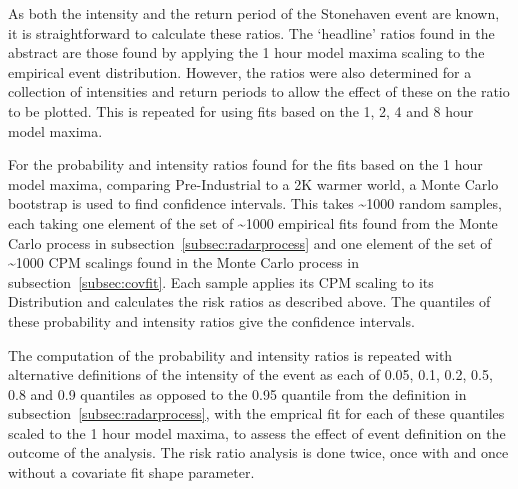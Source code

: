 As both the intensity and the return period of the Stonehaven event are known,
    it is straightforward to calculate these ratios.
The `headline' ratios found in the abstract are those found by applying the 1 hour model maxima scaling to the empirical event distribution.
However, the ratios were also determined for a collection of intensities and return periods to allow the effect of these on the ratio to be plotted.
This is repeated for using fits based on the 1, 2, 4 and 8 hour model maxima.

For the probability and intensity ratios found for the fits based on the 1 hour model maxima,
    comparing Pre-Industrial to a 2K warmer world,
    a Monte Carlo bootstrap is used to find confidence intervals.
This takes \textasciitilde1000 random samples, each taking one element of the set of \textasciitilde1000 empirical fits found from the Monte Carlo process in subsection~\ref{subsec:radarprocess}
    and one element of the set of \textasciitilde1000 CPM scalings found in the Monte Carlo process in subsection~\ref{subsec:covfit}.
Each sample applies its CPM scaling to its Distribution and calculates the risk ratios as described above.
The quantiles of these probability and intensity ratios give the confidence intervals.

The computation of the probability and intensity ratios is repeated with alternative definitions of the intensity of the event
    as each of 0.05, 0.1, 0.2, 0.5, 0.8 and 0.9 quantiles as opposed to the 0.95 quantile from the definition in subsection~\ref{subsec:radarprocess},
    with the emprical fit for each of these quantiles scaled to the 1 hour model maxima,
    to assess the effect of event definition on the outcome of the analysis.
The risk ratio analysis is done twice, once with and once without a covariate fit shape parameter.